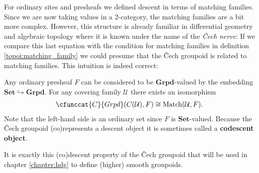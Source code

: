     For ordinary sites and presheafs we defined descent in terms of matching families. Since we are now taking values in a 2-category, the matching families are a bit more complex. However, this structure is already familiar in differential geometry and algebraic topology where it is known under the name of the \textit{\v{C}ech nerve}:
    If we compare this last equation with the condition for matching families in definition \ref{topoi:matching_family} we could presume that the \v{C}ech groupoid is related to matching families. This intuition is indeed correct:
    \begin{property}\label{topoi:cech_matching_families}
        Any ordinary presheaf $F$ can be considered to be $\mathbf{Grpd}$-valued by the embedding $\mathbf{Set}\hookrightarrow\mathbf{Grpd}$. For any covering family $\mathcal{U}$ there exists an isomorphism
        \begin{gather}
            \cfunccat{C}{Grpd}(C(\mathcal{U}), F)\cong\text{Match}(\mathcal{U}, F).
        \end{gather}
        Note that the left-hand side is an ordinary set since $F$ is $\mathbf{Set}$-valued. Because the \v{C}ech groupoid (co)represents a descent object it is sometimes called a \textbf{codescent object}.
    \end{property}
    It is exactly this (co)descent property of the \v{C}ech groupoid that will be used in chapter \ref{chapter:hdg} to define (higher) smooth groupoids.

